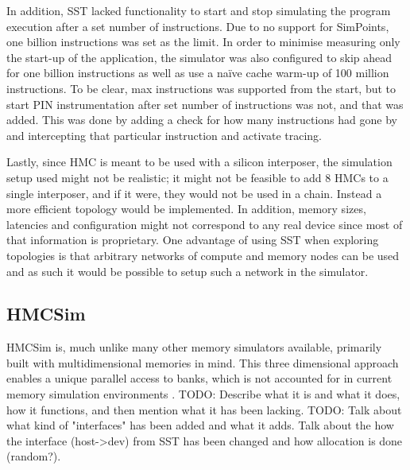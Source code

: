 In addition, SST lacked functionality to start and stop simulating the program execution after a set number of instructions. Due to no support for SimPoints, one billion instructions was set as the limit. In order to minimise measuring only the start-up of the application, the simulator was also configured to skip ahead for one billion instructions as well as use a naïve cache warm-up of 100 million instructions. To be clear, max instructions was supported from the start, but to start PIN instrumentation after set number of instructions was not, and that was added. This was done by adding a check for how many instructions had gone by and intercepting that particular instruction and activate tracing.
\bigskip

Lastly, since HMC is meant to be used with a silicon interposer, the simulation setup used might not be realistic; it might not be feasible to add 8 HMCs to a single interposer, and if it were, they would not be used in a chain. Instead a more efficient topology would be implemented. In addition, memory sizes, latencies and configuration might not correspond to any real device since most of that information is proprietary. One advantage of using SST when exploring topologies is that arbitrary networks of compute and memory nodes can be used and as such it would be possible to setup such a network in the simulator.




\subsection{HMCSim} \label{HMC-Sim}
HMCSim is, much unlike many other memory simulators available, primarily built with multidimensional memories in mind. This three dimensional approach enables a unique parallel access to banks, which is not accounted for in current memory simulation environments \cite{6969550}. 
TODO: Describe what it is and what it does, how it functions, and then mention what it has been lacking. 
TODO: Talk about what kind of "interfaces" has been added and what it adds. Talk about the how the interface (host->dev) from SST has been changed and how allocation is done (random?).
\bigskip

